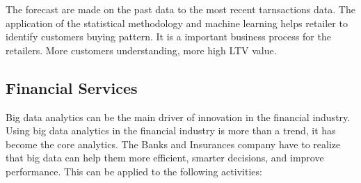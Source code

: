 \documentclass[]{book}
\begin{document}
The forecast are made on the past data to the most recent tarnsactions
data. The application of the statistical methodology and machine
learning helps retailer to identify customers buying pattern. It is a
important business process for the retailers. More customers
understanding, more high LTV value.

\subsection{Financial Services}\label{financial-services}

Big data analytics can be the main driver of innovation in the financial
industry. Using big data analytics in the financial industry is more
than a trend, it has become the core analytics. The Banks and Insurances
company have to realize that big data can help them more efficient,
smarter decisions, and improve performance. This can be applied to the
following activities:
\end{document}
